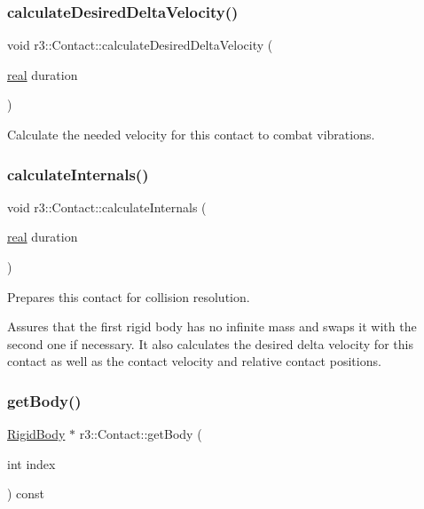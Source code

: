 \subsubsection{\texorpdfstring{calculate\+Desired\+Delta\+Velocity()}{calculateDesiredDeltaVelocity()}}
{\footnotesize\ttfamily void r3\+::\+Contact\+::calculate\+Desired\+Delta\+Velocity (\begin{DoxyParamCaption}\item[{\mbox{\hyperlink{namespacer3_ab2016b3e3f743fb735afce242f0dc1eb}{real}}}]{duration }\end{DoxyParamCaption})}



Calculate the needed velocity for this contact to combat vibrations. 

\mbox{\label{classr3_1_1_contact_a4e00a32cb21ff4fc8ec826f163bcddae}} 
\subsubsection{\texorpdfstring{calculate\+Internals()}{calculateInternals()}}
{\footnotesize\ttfamily void r3\+::\+Contact\+::calculate\+Internals (\begin{DoxyParamCaption}\item[{\mbox{\hyperlink{namespacer3_ab2016b3e3f743fb735afce242f0dc1eb}{real}}}]{duration }\end{DoxyParamCaption})}



Prepares this contact for collision resolution. 

Assures that the first rigid body has no infinite mass and swaps it with the second one if necessary. It also calculates the desired delta velocity for this contact as well as the contact velocity and relative contact positions. \mbox{\label{classr3_1_1_contact_aaa7c4c676fd8f3b07f81cc18257c48d9}} 
\subsubsection{\texorpdfstring{get\+Body()}{getBody()}}
{\footnotesize\ttfamily \mbox{\hyperlink{classr3_1_1_rigid_body}{Rigid\+Body}} $\ast$ r3\+::\+Contact\+::get\+Body (\begin{DoxyParamCaption}\item[{int}]{index }\end{DoxyParamCaption}) const}

